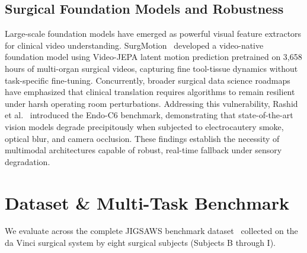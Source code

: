 \documentclass[10pt,journal]{IEEEtran}
\begin{document}
\subsection{Surgical Foundation Models and Robustness}
Large-scale foundation models have emerged as powerful visual feature extractors for clinical video understanding. SurgMotion~\cite{wu2026surgmotion} developed a video-native foundation model using Video-JEPA latent motion prediction pretrained on 3,658 hours of multi-organ surgical videos, capturing fine tool-tissue dynamics without task-specific fine-tuning. Concurrently, broader surgical data science roadmaps~\cite{maierhein2022surgical} have emphasized that clinical translation requires algorithms to remain resilient under harsh operating room perturbations. Addressing this vulnerability, Rashid et al.~\cite{rashid2025robustendoclip} introduced the Endo-C6 benchmark, demonstrating that state-of-the-art vision models degrade precipitously when subjected to electrocautery smoke, optical blur, and camera occlusion. These findings establish the necessity of multimodal architectures capable of robust, real-time fallback under sensory degradation.

\section{Dataset \& Multi-Task Benchmark}
We evaluate across the complete JIGSAWS benchmark dataset~\cite{gao2014jigsaws, ahmidi2017dataset} collected on the da Vinci surgical system by eight surgical subjects (Subjects B through I).

\begin{table}[t]
\centering
\caption{JIGSAWS Benchmark Task and Gesture Distribution}
\label{tab:dataset_stats}
\end{table}
\end{document}
